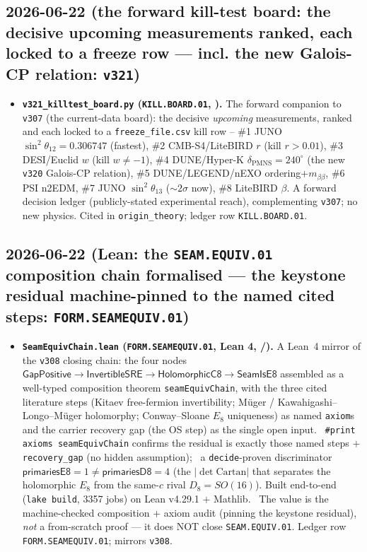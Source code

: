 \subsection*{2026-06-22 (the forward kill-test board: the decisive upcoming measurements ranked, each locked to a freeze row --- incl. the new Galois-CP relation: \texttt{v321})}
\begin{itemize}
\item \textbf{\texttt{v321\_killtest\_board.py} (\texttt{KILL.BOARD.01}, \mE).} The forward companion to \texttt{v307}
  (the current-data board): the decisive \emph{upcoming} measurements, ranked and each locked to a
  \texttt{freeze\_file.csv} kill row -- \#1 JUNO $\sin^2\theta_{12}{=}0.306747$ (fastest), \#2 CMB-S4/LiteBIRD $r$
  (kill $r{>}0.01$), \#3 DESI/Euclid $w$ (kill $w{\ne}{-}1$), \#4 DUNE/Hyper-K $\delta_{\mathrm{PMNS}}{=}240^\circ$
  (the new \texttt{v320} Galois-CP relation), \#5 DUNE/LEGEND/nEXO ordering$+m_{\beta\beta}$, \#6 PSI n2EDM, \#7 JUNO
  $\sin^2\theta_{13}$ ($\sim2\sigma$ now), \#8 LiteBIRD $\beta$. A forward decision ledger (publicly-stated
  experimental reach), complementing \texttt{v307}; no new physics. Cited in \texttt{origin\_theory}; ledger row
  \texttt{KILL.BOARD.01}.
\end{itemize}

\subsection*{2026-06-22 (Lean: the \texttt{SEAM.EQUIV.01} composition chain formalised --- the keystone residual machine-pinned to the named cited steps: \texttt{FORM.SEAMEQUIV.01})}
\begin{itemize}
\item \textbf{\texttt{SeamEquivChain.lean} (\texttt{FORM.SEAMEQUIV.01}, Lean 4, \mE/\mO).} A Lean~4 mirror of the
  \texttt{v308} closing chain: the four nodes $\textsf{GapPositive}\to\textsf{InvertibleSRE}\to\textsf{HolomorphicC8}
  \to\textsf{SeamIsE8}$ assembled as a well-typed composition theorem \texttt{seamEquivChain}, with the three cited
  literature steps (Kitaev free-fermion invertibility; M\"uger / Kawahigashi--Longo--M\"uger holomorphy;
  Conway--Sloane $E_8$ uniqueness) as named \texttt{axiom}s and the carrier recovery gap (the OS step) as the single
  open input. \mE\ \texttt{\#print axioms seamEquivChain} confirms the residual is exactly those named steps $+$
  \texttt{recovery\_gap} (no hidden assumption); \mE\ a \texttt{decide}-proven discriminator
  $\textsf{primariesE8}=1\ne\textsf{primariesD8}=4$ (the $|\det\mathrm{Cartan}|$ that separates the holomorphic
  $E_8$ from the same-$c$ rival $D_8{=}SO(16)$). Built end-to-end (\texttt{lake build}, 3357 jobs) on Lean
  v4.29.1 $+$ Mathlib. \mO\ The value is the machine-checked composition $+$ axiom audit (pinning the keystone
  residual), \emph{not} a from-scratch proof --- it does NOT close \texttt{SEAM.EQUIV.01}. Ledger row
  \texttt{FORM.SEAMEQUIV.01}; mirrors \texttt{v308}.
\end{itemize}


